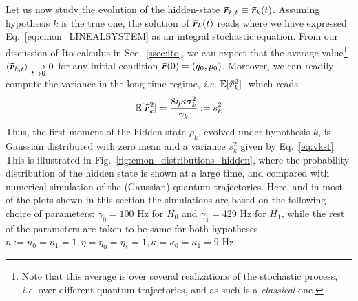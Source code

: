 Let us now study the evolution of the hidden-state $\bm{\bar{r}}_{k,t}\equiv\bm{\bar{r}}_k(t)$. Assuming hypothesis $k$ is the true one, the solution of $\bm{\bar{r}}_k(t)$ reads
where we have expressed Eq.~\ref{eq:cmon_LINEALSYSTEM} as an integral stochastic equation. From our discussion of Ito calculus in Sec.~\ref{ssec:ito}, we can expect that the average value\footnote{Note that this average is over several realizations of the stochastic process, \textit{i.e.} over different quantum trajectories, and as such is a \textit{classical} one.} $\mathinner{\langle \bm{\bar{r}}_{k,t}\rangle}\underset{t\rightarrow0}{\longrightarrow}0$ for any initial condition $\bm{\bar{r}}(0) = (q_0, p_0)$.
Moreover, we can readily compute the variance in the long-time regime, \textit{i.e.} $\mathbb{E}[\bm{\bar{r}}_k^2]$, which reads
\begin{align}\label{eq:vkst}
\mathbb{E}[\bm{\bar{r}}_k^2] = \frac{8 \eta \kappa \sigma_k^2}{\gamma_k} := s^2_k
\end{align}
Thus, the first moment of the hidden state $\rho_k$, evolved under hypothesis $k$, is Gaussian distributed with zero mean and a variance $s^2_k$ given by Eq.~\ref{eq:vkst}. This is illustrated in Fig.~\ref{fig:cmon_distributions_hidden}, where the probability distribution of the hidden state is shown at a large time, and compared with numerical simulation of the (Gaussian) quantum trajectories. Here, and in most of the plots shown in this section the simulations are based on the following choice of parameters:  $\gamma_{0}=100$ Hz for $H_{0}$ and $\gamma_{1}=429$ Hz for $H_{1}$, while the rest of the parameters are taken to be same for both hypotheses
 $n:=n_{0}=n_{1}=1, \eta=\eta_0=\eta_{1}=1, \kappa=\kappa_{0}=\kappa_{1}=9$ Hz.

